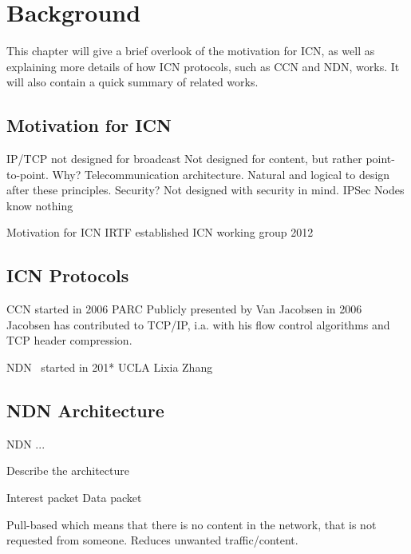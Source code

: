 \chapter{Background}\label{chp:background} 

This chapter will give a brief overlook of the motivation for \gls{ICN},
as well as explaining more details of how \gls{ICN} protocols, such as \gls{CCN} and \gls{NDN}, works. 
It will also contain a quick summary of related works.

\section{Motivation for \gls{ICN}}
IP/TCP not designed for broadcast
Not designed for content, but rather point-to-point. 
Why? Telecommunication architecture. 
Natural and logical to design after these principles.
Security? Not designed with security in mind. IPSec
Nodes know nothing

Motivation for \gls{ICN}
\gls{IRTF} established \gls{ICN} working group 2012

\section{\gls{ICN} Protocols}\label{chp2:sec:icn}
\gls{CCN} started in 2006
\gls{PARC}
Publicly presented by Van Jacobsen in 2006
Jacobsen has contributed to TCP/IP, i.a. with his flow control algorithms and TCP header compression. 

\gls{NDN}~\cite{DBLP:journals/ccr/0001ABJcCPWZ14} started in 201*
\gls{UCLA}
Lixia Zhang

\section{NDN Architecture}\label{chp2:sec:ndn_architecture}
\gls{NDN} ...


Describe the architecture ~\cite{NDN-0021}

Interest packet
Data packet

Pull-based which means that there is no content in the network, that is not requested from someone.
Reduces unwanted traffic/content. 

